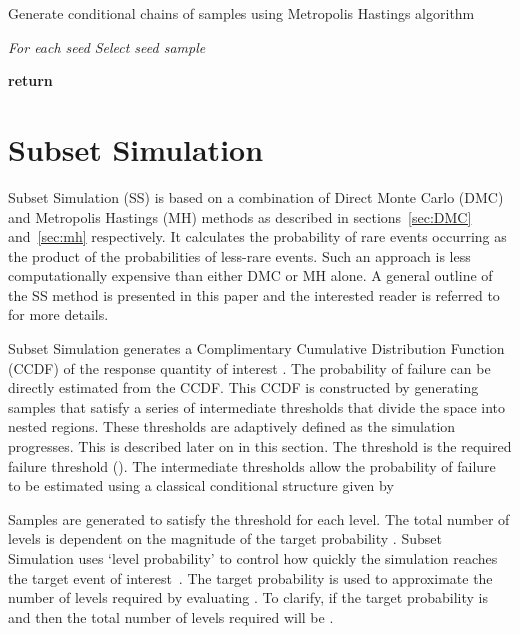 \documentclass[journal]{IEEEtran}
\begin{document}
\begin{algorithm}\caption{Generate conditional chains of samples using Metropolis Hastings algorithm}
\label{alg:mh}
\begin{algorithmic}[1]
	\State 
	\For{\texttt{}} \textit{ For each seed}	
		\State 	\textit{Select seed sample}
		\For{\texttt{}}
			
			\State 
			\State 
			

			\State 
			\State 
			\State 
			
\State 
		\EndFor	
	\EndFor

\State \textbf{return }

\EndFunction
\end{algorithmic}
\end{algorithm}

\section{Subset Simulation}
\label{sec:SS}
Subset Simulation (SS) is based on a combination of Direct Monte Carlo (DMC) and Metropolis Hastings (MH) methods as described in sections~\ref{sec:DMC} and~\ref{sec:mh} respectively. It calculates the probability of rare events occurring as the product of the probabilities of less-rare events. Such an approach is less computationally expensive than either DMC or MH alone. A general outline of the SS method is presented in this paper and the interested reader is referred to~\cite{IVAN} for more details.

Subset Simulation generates a Complimentary Cumulative Distribution Function (CCDF) of the response quantity of interest . The probability of failure  can be directly estimated from the CCDF. This CCDF is constructed by generating samples that satisfy a series of intermediate thresholds  that divide the space into  nested regions. These thresholds are adaptively defined as the simulation progresses. This is described later on in this section. The threshold  is the required failure threshold  (). The intermediate thresholds allow the probability of failure to be estimated using a classical conditional structure given by



Samples are generated to satisfy the threshold for each level. The total number of levels  is dependent on the magnitude of the target probability . Subset Simulation uses `level probability'  to control how quickly the simulation reaches the target event of interest~\cite{IVAN}. The target probability is used to approximate the number of levels  required by evaluating . To clarify, if the target probability is  and  then the total number of levels required will be .
\end{document}
